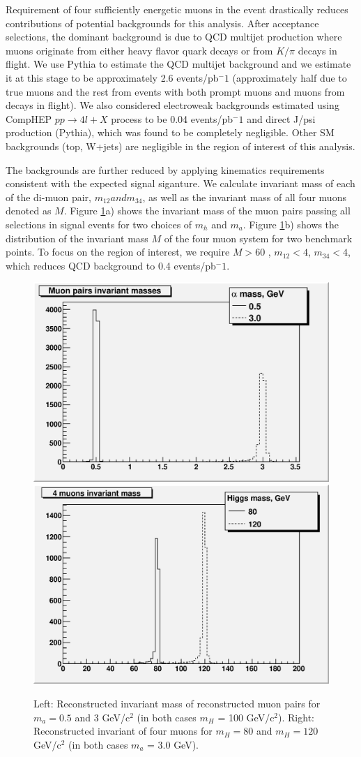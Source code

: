 \documentclass[aps,prl,twocolumn,nofootinbib,superscriptaddress]{revtex4}
\begin{document}
Requirement of four sufficiently energetic muons in the event drastically reduces contributions of 
potential backgrounds for this analysis. After acceptance selections, the dominant background is 
due to QCD multijet production where muons originate from either heavy flavor quark decays or from 
$K/\pi$ decays in flight. We use Pythia to estimate the QCD multijet background and we estimate it
at this stage to be approximately 2.6 events/pb$^-1$ (approximately half due to true muons and the 
rest from events with both prompt muons and muons from decays in flight). We also considered electroweak 
backgrounds estimated using CompHEP $pp \to 4l+X$ process to be 0.04 events/pb$^-1$ and direct J/psi 
production (Pythia), which was found to be completely negligible. Other SM backgrounds (top, W+jets) 
are negligible in the region of interest of this analysis.

The backgrounds are further reduced by applying kinematics requirements consistent
with the expected signal siganture. We calculate invariant mass of each of the di-muon pair, 
$m_{12} and m_{34}$, as well as the invariant mass of all four muons denoted as $M$. Figure 
\ref{muon_pairs_masses_invariant_mass}a) shows the invariant mass of the muon pairs passing 
all selections in signal events for two choices of $m_h$ and $m_a$. Figure \ref{muon_pairs_masses_invariant_mass}b) 
shows the distribution of the invariant mass $M$ of the four muon system for two benchmark points. 
To focus on the region of interest, we require $M>60$ \gevcc, $m_{12} < 4$, $m_{34} < 4$, which
reduces QCD background to 0.4 events/pb$^-1$. 

\begin{figure}[htb]
\begin{center}
\includegraphics[width=0.48\linewidth]{plots/muon_pairs_masses.eps}
\includegraphics[width=0.48\linewidth]{plots/invariant_mass.eps}
\caption{Left: Reconstructed invariant mass of reconstructed muon pairs for $m_a=0.5$ and 
3 GeV/c$^2$ (in both cases $m_H$ = 100 GeV/c$^2$). Right: Reconstructed invariant of four muons for 
$m_H=80$ and $m_H=120$ GeV/c$^2$ (in both cases $m_a$ = 3.0 GeV).}
\label{muon_pairs_masses_invariant_mass}
\end{center}
\end{figure}
\end{document}
